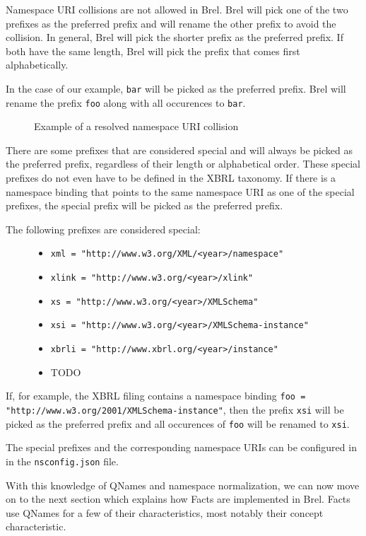Namespace URI collisions are not allowed in Brel. Brel will pick one of the two prefixes as the preferred prefix and will rename the other prefix to avoid the collision.
In general, Brel will pick the shorter prefix as the preferred prefix. If both have the same length, Brel will pick the prefix that comes first alphabetically.

In the case of our example, \texttt{bar} will be picked as the preferred prefix. 
Brel will rename the prefix \texttt{foo} along with all occurences to \texttt{bar}.

\begin{figure}[H]
    \caption{Example of a resolved namespace URI collision}
    \label{fig:namespace_uri_collision_example_renamed}
\end{figure}

There are some prefixes that are considered special and will always be picked as the preferred prefix, regardless of their length or alphabetical order.
These special prefixes do not even have to be defined in the XBRL taxonomy. 
If there is a namespace binding that points to the same namespace URI as one of the special prefixes, the special prefix will be picked as the preferred prefix.

The following prefixes are considered special:

\begin{figure}[H]
    \begin{itemize}
        \item \texttt{xml = "http://www.w3.org/XML/<year>/namespace"}
        \item \texttt{xlink = "http://www.w3.org/<year>/xlink"}
        \item \texttt{xs = "http://www.w3.org/<year>/XMLSchema"}
        \item \texttt{xsi = "http://www.w3.org/<year>/XMLSchema-instance"}
        \item \texttt{xbrli = "http://www.xbrl.org/<year>/instance"}
        \item TODO
    \end{itemize}
\end{figure}

If, for example, the XBRL filing contains a namespace binding \texttt{foo = "http://www.w3.org/2001/XMLSchema-instance"},
then the prefix \texttt{xsi} will be picked as the preferred prefix and all occurences of \texttt{foo} will be renamed to \texttt{xsi}.

The special prefixes and the corresponding namespace URIs can be configured in in the \texttt{nsconfig.json} file.

With this knowledge of QNames and namespace normalization, we can now move on to the next section which explains how Facts are implemented in Brel.
Facts use QNames for a few of their characteristics, most notably their concept characteristic.